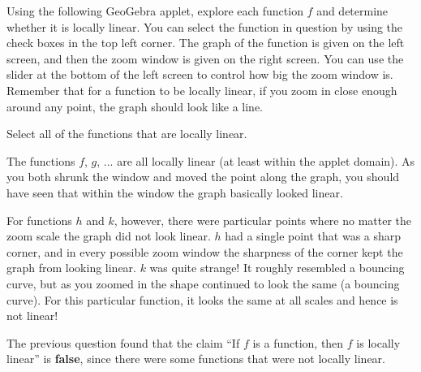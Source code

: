 \documentclass{ximera}
\begin{document}
\begin{question}

Using the following GeoGebra applet, explore each function $f$ and determine whether it is locally linear. You can select the function in question by using the check boxes in the top left corner. The graph of the function is given on the left screen, and then the zoom window is given on the right screen. You can use the slider at the bottom of the left screen to control how big the zoom window is. Remember that for a function to be locally linear, if you zoom in close enough around any point, the graph should look like a line.


\begin{prompt}
Select all of the functions that are locally linear.
\begin{selectAll}
\end{selectAll}
\begin{feedback}
    The functions $f$, $g$, ... are all locally linear (at least within the applet domain). As you both shrunk the window and moved the point along the graph, you should have seen that within the window the graph basically looked linear. 

    For functions $h$ and $k$, however, there were particular points where no matter the zoom scale the graph did not look linear. $h$ had a single point that was a sharp corner, and in every possible zoom window the sharpness of the corner kept the graph from looking linear. $k$ was quite strange! It roughly resembled a bouncing curve, but as you zoomed in the shape continued to look the same (a bouncing curve). For this particular function, it looks the same at all scales and hence is not linear!
\end{feedback}
\end{prompt}
\end{question}

The previous question found that the claim ``If $f$ is a function, then $f$ is locally linear'' is \textbf{false}, since there were some functions that were not locally linear.
\end{document}
